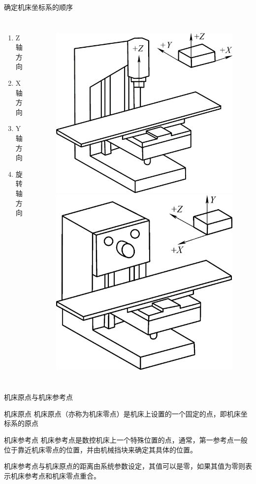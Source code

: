 \documentclass[UTF8,zihao=-4]{ctexbeamer}
\begin{document}
\begin{frame}{确定机床坐标系的顺序}
	\begin{columns}
		\begin{enumerate}
			\item Z轴方向
			\item X轴方向 
			\item Y轴方向
			\item 旋转轴方向
		\end{enumerate} 
		\begin{figure}
			\centering
			\includegraphics[width= 0.5\linewidth]{image/1-23}
			\includegraphics[width= 0.5\linewidth]{image/1-24}
			\label{fig:1-24}
		\end{figure}
	\end{columns}
\end{frame}

\begin{frame}{机床原点与机床参考点}
 
\begin{block}{ 机床原点}
	机床原点（亦称为机床零点）是机床上设置的一个固定的点，即机床坐标系的原点
\end{block} 

\begin{block}{ 机床参考点}
	机床参考点是数控机床上一个特殊位置的点，通常，第一参考点一般位于靠近机床零点的位置，并由机械挡块来确定其具体的位置。
\end{block} 


机床参考点与机床原点的距离由系统参数设定，其值可以是零，如果其值为零则表示机床参考点和机床零点重合。

\end{frame}
\end{document}
